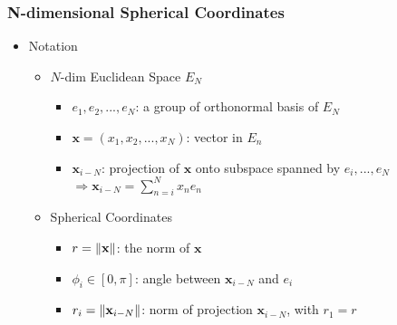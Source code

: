 \subsubsection{N-dimensional Spherical Coordinates}
\begin{itemize}
\item Notation
	\begin{itemize}
	\item $N$-dim Euclidean Space $E_N$
		\begin{itemize}
		\item $e_1, e_2,...,e_N$: a group of orthonormal basis of $E_N$
		\item $\mathbf x = (x_1, x_2,...,x_N)$: vector in $E_n$
		\item $\mathbf x_{i-N}$: projection of $\mathbf x$ onto subspace spanned by $e_i,...,e_N$ \\
			$\displaystyle \Rightarrow \mathbf x_{i-N} = \sum_{n=i}^N x_ne_n$
		\end{itemize}
	\item Spherical Coordinates
		\begin{itemize}
		\item $r=\lVert\mathbf x\rVert$: the norm of $\mathbf x$
		\item $\phi_i \in [0,\pi]$: angle between $\mathbf x_{i-N}$ and $e_i$
		\item $r_i=\lVert\mathbf x_{i-N}\rVert$: norm of projection $\mathbf x_{i-N}$, with $r_1 = r$
		\end{itemize}
	\end{itemize}
	

\end{itemize}
